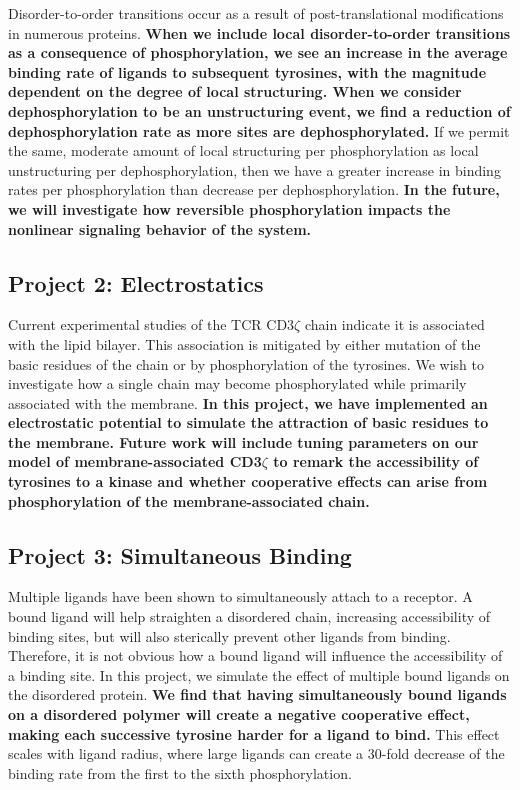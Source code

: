 \documentclass[onecolumn]{article}
\begin{document}
Disorder-to-order transitions occur as a result of post-translational modifications in numerous proteins. \textbf{When we include local disorder-to-order transitions as a consequence of phosphorylation, we see an increase in the average binding rate of ligands to subsequent tyrosines, with the magnitude dependent on the degree of local structuring. When we consider dephosphorylation to be an unstructuring event, we find a reduction of dephosphorylation rate as more sites are dephosphorylated.} If we permit the same, moderate amount of local structuring per phosphorylation as local unstructuring per dephosphorylation, then we have a greater increase in binding rates per phosphorylation than decrease per dephosphorylation. \textbf{In the future, we will investigate how reversible phosphorylation impacts the nonlinear signaling behavior of the system.}

\subsection*{Project 2: Electrostatics}

Current experimental studies of the TCR CD3$\zeta$ chain indicate it is associated with the lipid bilayer. This association is mitigated by either mutation of the basic residues of the chain or by phosphorylation of the tyrosines. We wish to investigate how a single chain may become phosphorylated while primarily associated with the membrane. \textbf{In this project, we have implemented an electrostatic potential to simulate the attraction of basic residues to the membrane. Future work will include tuning parameters on our model of membrane-associated CD3$\zeta$ to remark the accessibility of tyrosines to a kinase and whether cooperative effects can arise from phosphorylation of the membrane-associated chain.}

\subsection*{Project 3: Simultaneous Binding}

Multiple ligands have been shown to simultaneously attach to a receptor. A bound ligand will help straighten a disordered chain, increasing accessibility of binding sites, but will also sterically prevent other ligands from binding. Therefore, it is not obvious how a bound ligand will influence the accessibility of a binding site. In this project, we simulate the effect of multiple bound ligands on the disordered protein. \textbf{We find that having simultaneously bound ligands on a disordered polymer will create a negative cooperative effect, making each successive tyrosine harder for a ligand to bind.} This effect scales with ligand radius, where large ligands can create a 30-fold decrease of the binding rate from the first to the sixth phosphorylation.
\end{document}
